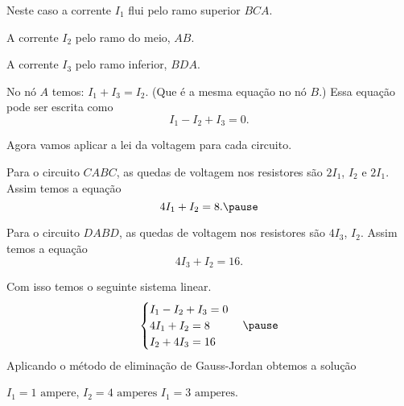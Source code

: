 \documentclass{beamer}
\begin{document}
    \begin{frame}
        Neste caso a corrente $I_1$ flui pelo ramo superior $BCA$.\pause

        \vspace{1cm}

        A corrente $I_2$ pelo ramo do meio, $AB$.\pause

        \vspace{1cm}

        A corrente $I_3$ pelo ramo inferior, $BDA$.\pause

        \vspace{1cm}

        No nó $A$ temos: $I_1 + I_3 = I_2$. \pause (Que é a mesma equação no nó $B$.) \pause Essa equação pode ser escrita como\pause
        \[
            I_1 - I_2 + I_3 = 0.
        \]
    \end{frame}

    \begin{frame}
        Agora vamos aplicar a lei da voltagem para cada circuito.\pause

        \vspace{1cm}

        Para o circuito $CABC$, \pause as quedas de voltagem nos resistores são \pause $2I_1$, \pause $I_2$ \pause e $2I_1$. \pause Assim temos a equação\pause
        \[
            4I_1 + I_2 = 8.\pause
        \]

        Para o circuito $DABD$, \pause as quedas de voltagem nos resistores são \pause $4I_3$, \pause $I_2$. Assim temos a equação\pause
        \[
            4I_3 + I_2 = 16.
        \]
    \end{frame}

    \begin{frame}
        Com isso temos o seguinte sistema linear.
        \[
            \begin{cases}
                I_1 - I_2 + I_3 = 0\\
                4I_1 + I_2 = 8\\
                I_2 + 4I_3 = 16
            \end{cases}\pause
        \]
        Aplicando o método de eliminação de Gauss-Jordan obtemos a solução\pause
        \begin{center}
            $I_1 = 1 \mbox{ ampere}$, $I_2 = 4 \mbox{ amperes}$ $I_1 = 3 \mbox{ amperes}$.
        \end{center}
    \end{frame}
\end{document}
